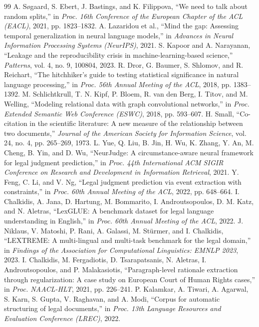\begin{thebibliography}{99}
 A. S{\o}gaard, S. Ebert, J. Bastings, and K. Filippova, ``We need to talk about random splits,'' in \emph{Proc. 16th Conference of the European Chapter of the ACL (EACL)}, 2021, pp. 1823--1832.
 A. Lazaridou et al., ``Mind the gap: Assessing temporal generalization in neural language models,'' in \emph{Advances in Neural Information Processing Systems (NeurIPS)}, 2021.
 S. Kapoor and A. Narayanan, ``Leakage and the reproducibility crisis in machine-learning-based science,'' \emph{Patterns}, vol. 4, no. 9, 100804, 2023.
 R. Dror, G. Baumer, S. Shlomov, and R. Reichart, ``The hitchhiker's guide to testing statistical significance in natural language processing,'' in \emph{Proc. 56th Annual Meeting of the ACL}, 2018, pp. 1383--1392.
 M. Schlichtkrull, T. N. Kipf, P. Bloem, R. van den Berg, I. Titov, and M. Welling, ``Modeling relational data with graph convolutional networks,'' in \emph{Proc. Extended Semantic Web Conference (ESWC)}, 2018, pp. 593--607.
 H. Small, ``Co-citation in the scientific literature: A new measure of the relationship between two documents,'' \emph{Journal of the American Society for Information Science}, vol. 24, no. 4, pp. 265--269, 1973.
 L. Yue, Q. Liu, B. Jin, H. Wu, K. Zhang, Y. An, M. Cheng, B. Yin, and D. Wu, ``NeurJudge: A circumstance-aware neural framework for legal judgment prediction,'' in \emph{Proc. 44th International ACM SIGIR Conference on Research and Development in Information Retrieval}, 2021.
 Y. Feng, C. Li, and V. Ng, ``Legal judgment prediction via event extraction with constraints,'' in \emph{Proc. 60th Annual Meeting of the ACL}, 2022, pp. 648--664.
 I. Chalkidis, A. Jana, D. Hartung, M. Bommarito, I. Androutsopoulos, D. M. Katz, and N. Aletras, ``LexGLUE: A benchmark dataset for legal language understanding in English,'' in \emph{Proc. 60th Annual Meeting of the ACL}, 2022.
 J. Niklaus, V. Matoshi, P. Rani, A. Galassi, M. St\"urmer, and I. Chalkidis, ``LEXTREME: A multi-lingual and multi-task benchmark for the legal domain,'' in \emph{Findings of the Association for Computational Linguistics: EMNLP 2023}, 2023.
 I. Chalkidis, M. Fergadiotis, D. Tsarapatsanis, N. Aletras, I. Androutsopoulos, and P. Malakasiotis, ``Paragraph-level rationale extraction through regularization: A case study on European Court of Human Rights cases,'' in \emph{Proc. NAACL-HLT}, 2021, pp. 226--241.
 P. Kalamkar, A. Tiwari, A. Agarwal, S. Karn, S. Gupta, V. Raghavan, and A. Modi, ``Corpus for automatic structuring of legal documents,'' in \emph{Proc. 13th Language Resources and Evaluation Conference (LREC)}, 2022.

\end{thebibliography}

